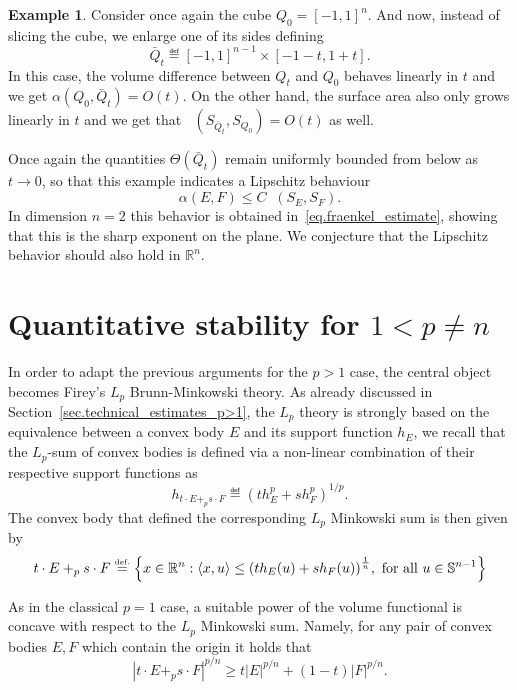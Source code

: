 \documentclass[a4paper, 10pt, twoside]{amsart}
\numberwithin{equation}{section}
\newcommand{\explname}{Example}
\theoremstyle{plain}
\theoremstyle{definition}
\newtheorem{example}[theorem]{\explname}
\DeclareMathOperator{\dc}{\mathrm{d}_\mathrm{C}}
\begin{document}
\begin{example}\label{exemple.sharp_fraenkel}
    Consider once again the cube $Q_0 = {[-1,1]}^n$. And now, instead of slicing the cube, we enlarge one of its sides defining 
    \[
        \bar Q_t \eqdef 
       {[-1,1]}^{n-1}\times [-1-t,1 + t]. 
    \]
    In this case, the volume difference between $Q_t$ and $Q_0$ behaves linearly in $t$ and we get $\alpha(Q_0, \bar Q_t) = O(t)$. On the other hand, the surface area also only grows linearly in $t$ and we get that $\dc(S_{\bar Q_t}, S_{Q_0}) = O(t)$ as well.  


    Once again the quantities $\Theta(\bar Q_t)$ remain uniformly bounded from below as $t \to 0$, so that this example indicates a Lipschitz behaviour
    \[
        \alpha(E, F) \le C 
        \dc(S_E, S_F).
    \]
    In dimension $n = 2$ this behavior is obtained in~\eqref{eq.fraenkel_estimate}, showing that this is the sharp exponent on the plane. We conjecture that the Lipschitz behavior should also hold in $\mathbb{R}^n$.  
\end{example}

\section{Quantitative stability for $1 < p \neq n$}
\label{secp>1}

In order to adapt the previous arguments for the $p > 1$ case, the central object becomes Firey's $L_p$ Brunn-Minkowski theory. As already discussed in Section~\ref{sec.technical_estimates_p>1}, the $L_p$ theory is strongly based on the equivalence between a convex body $E$ and its support function $h_E$, we recall that the $L_p$-sum of convex bodies is defined via a non-linear combination of their respective support functions as
\begin{equation}
    h_{t\cdot E +_p s\cdot F} \eqdef 
    {\left(
        t h_E^p + s h_F^p
    \right)}^{1/p}.
\end{equation}
The convex body that defined the corresponding $L_p$ Minkowski sum is then given by 
\begin{equation}
    t\cdot E +_p s\cdot F
    \stackrel{\mbox{\upshape\tiny def.}}{=} 
    \left\{
        x \in \mathbb{R}^n: 
        \left\langle x,u\right\rangle
        \le 
        {\left( t h_E(u) + s h_F(u) \right)}^{\frac{1}{n}}, \text{ for all }
        u \in \mathbb{S}^{n-1}
    \right\}
\end{equation}

As in the classical $p=1$ case, a suitable power of the volume functional is concave with respect to the $L_p$ Minkowski sum. Namely, for any pair of convex bodies $E,F$ which contain the origin it holds that 
\begin{equation}\label{eq.LpBM_}
    {|t\cdot E +_p s \cdot F|}^{p/n} \ge 
    t{|E|}^{p/n} + (1-t){|F|}^{p/n}. 
\end{equation}
\end{document}

